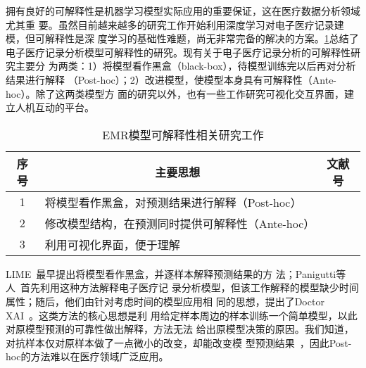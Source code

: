 拥有良好的可解释性是机器学习模型实际应用的重要保证，这在医疗数据分析领域尤其重
要。虽然目前越来越多的研究工作开始利用深度学习对电子医疗记录建模，但可解释性是深
度学习的基础性难题，尚无非常完备的解决的方案。\cref{tab:interpretability}总结了
电子医疗记录分析模型可解释性的研究。现有关于电子医疗记录分析的可解释性研究主要分
为两类：1）将模型看作黑盒（black-box），待模型训练完以后再对分析结果进行解释
（Post-hoc）；2）改进模型，使模型本身具有可解释性（Ante-hoc）。除了这两类模型方
面的研究以外，也有一些工作研究可视化交互界面，建立人机互动的平台。

\begin{table}
    \renewcommand\arraystretch{1.5}
    \begin{small}
        \caption{EMR模型可解释性相关研究工作}
        \label{tab:interpretability}
        \begin{center}
            \begin{tabular}[c]{cll}
                \toprule
                \multicolumn{1}{c}{\textbf{序号}} & 
                \multicolumn{1}{c}{\textbf{主要思想}} &
                \multicolumn{1}{c}{\textbf{文献号}}\\
                \midrule
                1 & 将模型看作黑盒，对预测结果进行解释（Post-hoc） & \cite{panigutti2019explaining}
                \cite{panigutti2020doctor} \\
                2 & 修改模型结构，在预测同时提供可解释性（Ante-hoc） &
                \cite{choi2016retain} \cite{ma2017dipole} \cite{bai2018interpretable}
                \cite{gao2019camp} \cite{ma2019adacare} \\
                3 & 利用可视化界面，便于理解 & \cite{kwon2018retainvis} \cite{jin2020carepre}
                \cite{guo2020comparative} \\
                \bottomrule
            \end{tabular}
        \end{center}
    \end{small}
\end{table}

LIME~最早提出将模型看作黑盒，并逐样本解释预测结果的方
法；Panigutti等人~首先利用这种方法解释电子医疗记
录分析模型，但该工作解释的模型缺少时间属性；随后，他们由针对考虑时间的模型应用相
同的思想，提出了Doctor XAI~。这类方法的核心思想是利
用给定样本周边的样本训练一个简单模型，以此对原模型预测的可靠性做出解释，方法无法
给出原模型决策的原因。我们知道，对抗样本仅对原样本做了一点微小的改变，却能改变模
型预测结果~，因此Post-hoc的方法难以在医疗领域广泛应用。


